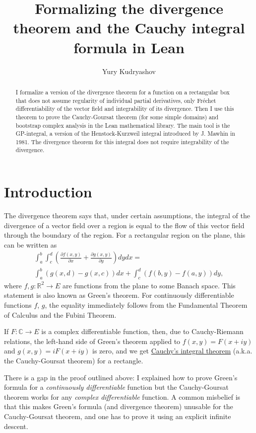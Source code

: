 \documentclass[a4paper, UKenglish,cleveref, autoref, thm-restate]{lipics-v2021}
\author{Yury Kudryashov}{University of Toronto at Mississauga, Canada (till July 2022); Texas A\&M University, USA (since August 2022)}{urkud@urkud.name}{https://orcid.org/0000-0003-4286-9276}{}
\title{Formalizing the divergence theorem and the Cauchy integral formula in Lean}
\newcommand{\bbR}{\mathbb{R}}
\newcommand{\bbC}{\mathbb{C}}
\begin{document}
\sloppy
\maketitle

\begin{abstract}
  I formalize a version of the divergence theorem for a function on a
  rectangular box that does not assume regularity of individual
  partial derivatives, only Fréchet differentiability of the vector
  field and integrability of its divergence. Then I use this theorem
  to prove the Cauchy-Goursat theorem (for some simple domains) and
  bootstrap complex analysis in the Lean mathematical library. The
  main tool is the GP-integral, a version of the Henstock-Kurzweil
  integral introduced by J. Mawhin in 1981. The divergence theorem for
  this integral does not require integrability of the divergence.
\end{abstract}

\section{Introduction}\label{sec:introduction}
The divergence theorem says that, under certain assumptions, the
integral of the divergence of a vector field over a region is equal to
the flow of this vector field through the boundary of the region. For
a rectangular region on the plane, this can be written as
\begin{multline}
  \label{eqn:green-rect}
  \int_{a}^{b}\int_{c}^{d}\left(\frac{\partial f(x, y)}{\partial x}+\frac{\partial g(x, y)}{\partial y}\right)dydx=\\
  \int_{a}^{b}\left(g(x, d)-g(x, c)\right)dx+\int_{c}^{d}\left(f(b, y)-f(a, y)\right)dy,
\end{multline}
where \(f, g\colon \bbR^{2}\to E\) are functions from the plane to
some Banach space. This statement is also known as Green's theorem.
For continuously differentiable functions \(f\), \(g\), the equality
immediately follows from the Fundamental Theorem of Calculus and the
Fubini Theorem.

If \(F\colon \bbC\to E\) is a complex differentiable function, then, due
to Cauchy-Riemann relations, the left-hand side of Green's theorem
applied to \(f(x, y)=F(x+iy)\) and \(g(x, y)=iF(x+iy)\) is zero, and
we get
\href{https://en.wikipedia.org/wiki/Cauchy's_integral_theorem}{Cauchy's
  integral theorem} (a.k.a. the Cauchy-Goursat theorem) for a rectangle.

There is a gap in the proof outlined above: I explained how to prove
Green's formula for a \emph{continuously differentiable} function
but the Cauchy-Goursat theorem works for any \emph{complex
  differentiable} function. A common misbelief is that this makes
Green's formula (and divergence theorem) unusable for the Cauchy-Goursat
theorem, and one has to prove it using an explicit infinite descent.
\end{document}
